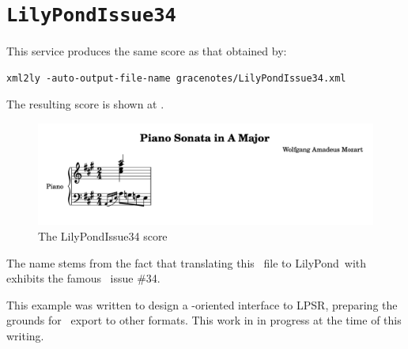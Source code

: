 \section{{\tt LilyPondIssue34}}

This service produces the same score as that obtained by:
\begin{lstlisting}[language=CPlusPlus]
xml2ly -auto-output-file-name gracenotes/LilyPondIssue34.xml
\end{lstlisting}

The resulting score is shown at .
\begin{figure}[htbp]
\begin{center}
\includegraphics[scale=0.9]{../graphics/LilyPondIssue34.png}
\caption{The LilyPondIssue34 score}
\label{The LilyPondIssue34 score}
\end{center}
\end{figure}

The name  stems from the fact that translating this \mxml\ file to LilyPond\ with \fileName{\mxmlToLy} exhibits the famous \lily\ issue \#34.

This example was written to design a \lily-oriented interface to LPSR, preparing the grounds for \lily\ export to other formats. This work in in progress at the time of this writing.


